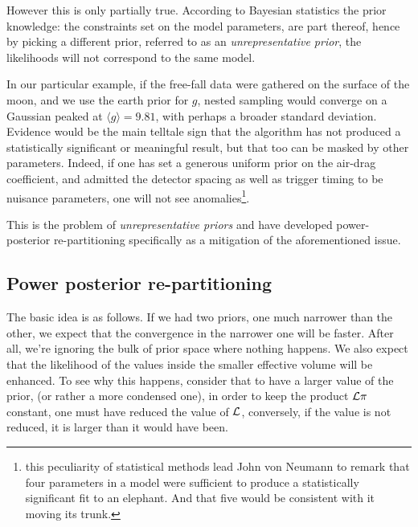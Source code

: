 \documentclass[usenatbib]{mnras}
\begin{document}
However this is only partially true. According to Bayesian
statistics the prior knowledge: the constraints set on the model
parameters, are part thereof, hence by picking a different prior,
referred to as an \emph{unrepresentative prior}, the likelihoods will not
correspond to the same model.

In our particular example, if the free-fall data were gathered on
the surface of the moon, and we use the earth prior for \(g\),
nested sampling would converge on a Gaussian peaked at \(\langle g \rangle=9.81\),
with perhaps a broader standard deviation. Evidence would be the
main telltale sign that the algorithm has not produced a
statistically significant or meaningful result, but that too can be
masked by other parameters. Indeed, if one has set a generous
uniform prior on the air-drag coefficient, and admitted the
detector spacing as well as trigger timing to be nuisance
parameters, one will not see anomalies\footnote{this peculiarity of
statistical methods lead John von Neumann to remark that four
parameters in a model were sufficient to produce a statistically
significant fit to an elephant. And that five would be consistent
with it moving its trunk.}.

This is the problem of \emph{unrepresentative priors} and
\citeauthor*{chen-ferroz-hobson} have developed power-posterior
re-partitioning specifically as a mitigation of the aforementioned
issue.


\subsection{Power posterior re-partitioning}
\label{sec:orgc1b99ad}

The basic idea is as follows. If we had two priors, one much
narrower than the other, we expect that the convergence in the
narrower one will be faster. After all, we're ignoring the bulk of
prior space where nothing happens. We also expect that the
likelihood of the values inside the smaller effective volume will
be enhanced. To see why this happens, consider that to have a
larger value of the prior, (or rather a more condensed one), in
order to keep the product \(\cal L \pi\) constant, one must have
reduced the value of \(\cal L\), conversely, if the value is not
reduced, it is larger than it would have been.
\end{document}
